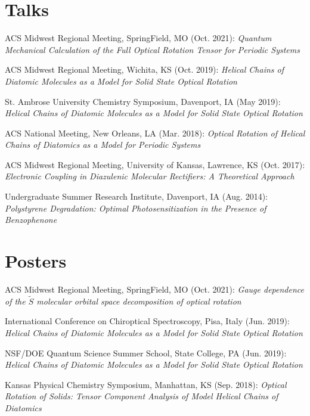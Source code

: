 \documentclass[a4paper,11pt]{article}
\begin{document}
\vspace{-5pt}
\section{Talks}
\begin{etaremune}

\item ACS Midwest Regional Meeting, SpringField, MO (Oct. 2021): \textit{Quantum Mechanical Calculation of the Full Optical Rotation Tensor for Periodic Systems} 


\item ACS Midwest Regional Meeting, Wichita, KS (Oct. 2019): \textit{Helical Chains of Diatomic Molecules as a Model for Solid State Optical Rotation} 


\item St. Ambrose University Chemistry Symposium, Davenport, IA (May 2019): \textit{Helical Chains of Diatomic Molecules as a Model for Solid State Optical Rotation}  

\item ACS National Meeting, New Orleans, LA (Mar. 2018): \textit{Optical Rotation of Helical Chains of Diatomics as a Model for Periodic Systems} 

\item ACS Midwest Regional Meeting, University of Kansas, Lawrence, KS (Oct. 2017): \textit{Electronic Coupling in Diazulenic Molecular Rectifiers: A Theoretical Approach} 

\item Undergraduate Summer Research Institute, Davenport, IA (Aug. 2014): \textit{Polystyrene Degradation: Optimal Photosensitization in the Presence of Benzophenone} 
\end{etaremune}	    
	    
\vspace{-5pt}
\section{Posters}
\begin{etaremune}


\item ACS Midwest Regional Meeting, SpringField, MO (Oct. 2021): \textit{Gauge dependence of the $\tilde{S}$ molecular orbital space decomposition of optical rotation} 

\item International Conference on Chiroptical Spectroscopy, Pisa, Italy (Jun. 2019): \textit{Helical Chains of Diatomic Molecules as a Model for Solid State Optical Rotation}  

\item NSF/DOE Quantum Science Summer School, State College, PA (Jun. 2019): \textit{Helical Chains of Diatomic Molecules as a Model for Solid State Optical Rotation}  

\item Kansas Physical Chemistry Symposium, Manhattan, KS (Sep. 2018): \textit{Optical Rotation of Solids: Tensor Component Analysis of Model Helical Chains of Diatomics}

\end{etaremune}	    
    
\end{document}
